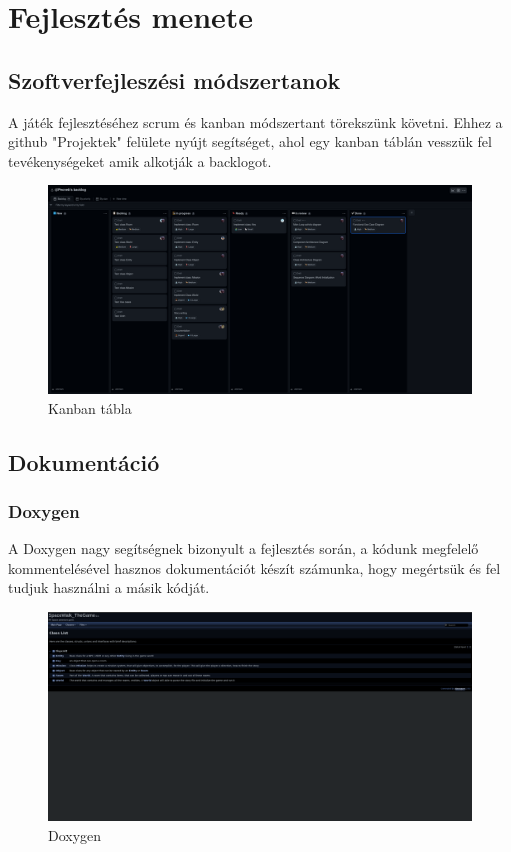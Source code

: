 \documentclass{scrarticle}
\begin{document}
\section{Fejlesztés menete}
\subsection{Szoftverfejleszési módszertanok}
A játék fejlesztéséhez scrum és kanban módszertant törekszünk követni. Ehhez a github "Projektek" felülete nyújt segítséget, ahol egy kanban táblán vesszük fel tevékenységeket amik alkotják a backlogot.
\begin{figure}[H]
    \includegraphics[width=1.0\columnwidth]{kanban_scrum.png}
    \caption{Kanban tábla}\label{fig:7}
\end{figure}
\subsection{Dokumentáció}
\subsubsection{Doxygen}
A Doxygen nagy segítségnek bizonyult a fejlesztés során, a kódunk megfelelő kommentelésével hasznos dokumentációt készít számunka, hogy megértsük és fel tudjuk használni a másik kódját.
\begin{figure}[H]
    \includegraphics[width=1.0\columnwidth]{doxygen_sample.png}
    \caption{Doxygen}\label{fig:8}
\end{figure}
\end{document}
